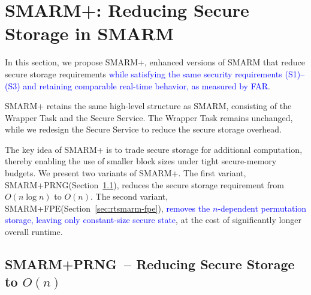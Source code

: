 \documentclass[journal]{IEEEtran}
\newcommand\ben[1]{\textcolor{blue}{#1}}
\newcommand{\rtsmarm}{SMARM+\xspace}
\newcommand{\rtsmarmone}{SMARM+PRNG\xspace}
\newcommand{\rtsmarmtwo}{SMARM+FPE\xspace}
\begin{document}
\section{\rtsmarm: Reducing Secure Storage in SMARM}
\label{sec:resmarm-design}



In this section, we propose \rtsmarm, enhanced versions of SMARM that reduce secure storage requirements \ben{while satisfying the same security requirements (S1)--(S3) and retaining comparable real-time behavior, as measured by FAR}.


\rtsmarm retains the same high-level structure as SMARM, consisting of the Wrapper Task and the Secure Service.
The Wrapper Task remains unchanged, while we redesign the Secure Service to reduce the secure storage overhead.

The key idea of \rtsmarm is to trade secure storage for additional computation, thereby enabling the use of smaller block sizes under tight secure-memory budgets.
We present two variants of \rtsmarm.
The first variant, \rtsmarmone (Section~\ref{sec:rtsmarm-bitarray}), reduces the secure storage requirement from $O(n \log n)$ to $O(n)$.
The second variant, \rtsmarmtwo (Section~\ref{sec:rtsmarm-fpe}), \ben{removes the $n$-dependent permutation storage, leaving only constant-size secure state}, at the cost of significantly longer overall runtime.




\subsection{\rtsmarmone\ -- Reducing Secure Storage to $O(n)$}
\label{sec:rtsmarm-bitarray}
\end{document}
